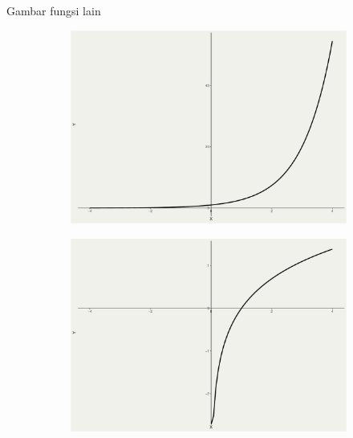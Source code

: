 \documentclass[
  ignorenonframetext,
]{beamer}
\begin{document}
\begin{frame}{Gambar fungsi lain}
\begin{figure}
\begin{minipage}{0.33\linewidth}
\begin{figure}[H]
{}


\end{figure}%

\end{minipage}%
%
\begin{minipage}{0.33\linewidth}

\begin{figure}[H]

{\centering \includegraphics{index_files/figure-beamer/unnamed-chunk-5-3.pdf}

}


\end{figure}%

\end{minipage}%
\newline
\begin{minipage}{0.33\linewidth}

\begin{figure}[H]

{\centering \includegraphics{index_files/figure-beamer/unnamed-chunk-5-4.pdf}

}
\end{figure}
\end{minipage}
\end{figure}
\end{frame}
\end{document}
